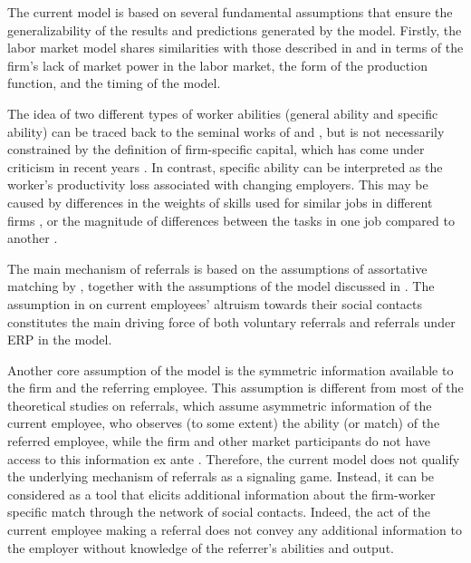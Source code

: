 \documentclass[12pt]{article}
\begin{document}
The current model is based on several fundamental assumptions that ensure the generalizability of the results and predictions generated by the model. Firstly, the labor market model shares similarities with those described in \cite{gibbons1999theory} and \cite{ekinci2016employee} in terms of the firm's lack of market power in the labor market, the form of the production function, and the timing of the model. 

The idea of two different types of worker abilities (general ability and specific ability) can be traced back to the seminal works of \cite{becker1962investment, becker1975investment} and \cite{jovanovic1979job}, but is not necessarily constrained by the definition of firm-specific capital, which has come under criticism in recent years  \citep{gibbons2004task, gathmann2010general}. In contrast, specific ability can be interpreted as the worker's productivity loss associated with changing employers. This may be caused by differences in the weights of skills used for similar jobs in different firms \citep{lazear2009firm}, or the magnitude of differences between the tasks in one job compared to another \citep{gibbons2004task}. 

The main mechanism of referrals is based on the assumptions of assortative matching by \cite{montgomery1991social}, together with the assumptions of the model discussed in \cite{friebel2023employee}. The assumption in \cite{friebel2023employee} on current employees' altruism towards their social contacts constitutes the main driving force of both voluntary referrals and referrals under ERP in the model. 

Another core assumption of the model is the symmetric information available to the firm and the referring employee. This assumption is different from most of the theoretical studies on referrals, which assume asymmetric information of the current employee, who observes (to some extent) the ability (or match) of the referred employee, while the firm and other market participants do not have access to this information ex ante \citep{saloner1985old, beaman2012gets, ekinci2016employee}. Therefore, the current model does not qualify the underlying mechanism of referrals as a signaling game. Instead, it can be considered as a tool that elicits additional information about the firm-worker specific match through the network of social contacts. Indeed, the act of the current employee making a referral does not convey any additional information to the employer without knowledge of the referrer's abilities and output.
\end{document}
